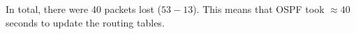

In total, there were 40 packets lost ($53-13$). This means that OSPF took $\approx 40$ seconds to update the routing tables.